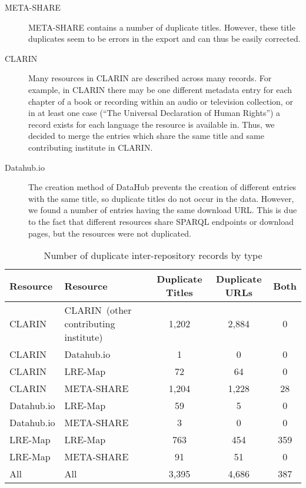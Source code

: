 \documentclass[11pt]{article}
\begin{document}
\begin{description}

	\item[META-SHARE] META-SHARE contains a number of duplicate titles.
            However, these title duplicates seem to be errors in the export and can thus be easily corrected. 

    \item[CLARIN] Many resources in CLARIN are described across many records.
        For example, in CLARIN there may be one different metadata entry for each chapter of a book or
        recording within an audio or television collection, or in at least one case
        (``The Universal Declaration of Human Rights'') a record exists for each
        language the resource is available in. Thus, we decided to merge the entries which
        share the same title and same contributing institute in CLARIN.
        
    \item[Datahub.io] The creation method of DataHub prevents the creation of
        different entries with the same title, so duplicate titles do not occur
        in the data. However, we found a number of entries having the same
        download URL. This is due to the fact that different resources share
        SPARQL endpoints or download pages, but the resources were not
        duplicated.
    
\end{description}

\begin{table*}
    \begin{center}
        \begin{tabular}{ll|ccc}
        Resource    & Resource    & Duplicate Titles & Duplicate URLs & Both \\
        \hline                                                                  
        CLARIN      & CLARIN{\tiny~(other contributing institute)}      & 1,202            & 2,884          & 0    \\
        CLARIN      & Datahub.io  & 1                & 0              & 0    \\
        CLARIN      & LRE-Map     & 72               & 64             & 0    \\
        CLARIN      & META-SHARE  & 1,204            & 1,228          & 28    \\
        Datahub.io  & LRE-Map     & 59               & 5              & 0    \\
        Datahub.io  & META-SHARE  & 3                & 0              & 0    \\
        LRE-Map     & LRE-Map     & 763              & 454            & 359  \\
        LRE-Map     & META-SHARE  & 91               & 51             & 0    \\
        \hline
        All         & All         & 3,395            & 4,686          & 387  \\
        \end{tabular}
    \end{center}
    \caption{\label{tab:dupes}Number of duplicate inter-repository records by type}
\end{table*}
\end{document}

